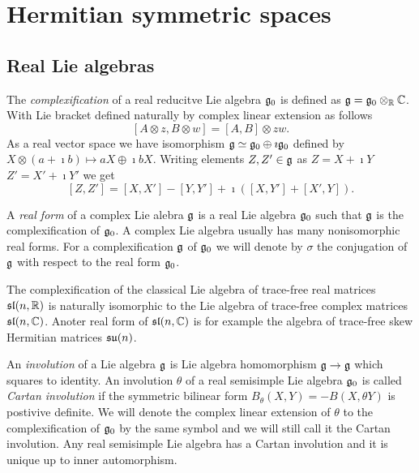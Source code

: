 \chapter{Hermitian symmetric spaces}\label{ch:hermitian}


\section{Real Lie algebras}

The \emph{complexification} of a real reducitve Lie algebra $\mathfrak{g}_0$ is defined as $\mathfrak{g} = \mathfrak{g}_0\otimes_{\mathbb{R}} \mathbb{C}$. With Lie bracket defined naturally by complex linear extension as follows
\[
 [A\otimes z, B\otimes w] = [A,B]\otimes zw.
\]
As a real vector space we have isomorphism $\mathfrak{g} \simeq \mathfrak{g}_0 \oplus \imath \mathfrak{g}_0$ defined by $X\otimes (a+\imath b) \mapsto aX \oplus \imath bX$. Writing elements $Z,Z'\in\mathfrak{g}$ as $Z = X + \imath Y$ $Z'=X'+\imath Y'$ we get \[[Z,Z'] = [X,X'] - [Y,Y'] + \imath \left( [X,Y'] + [X',Y]\right).\]

A \emph{real form} of a complex Lie alebra $\mathfrak{g}$ is a real Lie algebra $\mathfrak{g}_0$ such that $\mathfrak{g}$ is the complexification of $\mathfrak{g}_0$. A complex Lie algebra usually has many nonisomorphic real forms. For a complexification $\mathfrak{g}$ of $\mathfrak{g}_0$ we will denote by $\sigma$ the conjugation of $\mathfrak{g}$ with respect to the real form $\mathfrak{g}_0$.

\begin{example}
 The complexification of the classical Lie algebra of trace-free real matrices $\mathfrak{sl}(n,\mathbb{R})$ is naturally isomorphic to the Lie algebra of trace-free complex matrices $\mathfrak{sl}(n,\mathbb{C})$. Anoter real form of $\mathfrak{sl}(n,\mathbb{C})$ is for example the algebra of trace-free skew Hermitian  matrices  $\mathfrak{su}(n)$. %
\end{example}

An \emph{involution} of a Lie algebra $\mathfrak{g}$ is Lie algebra homomorphism $\mathfrak{g}\to\mathfrak{g}$ which squares to identity. An involution $\theta$ of a real semisimple Lie algebra $\mathfrak{g}_0$ is called \emph{Cartan involution} if the symmetric bilinear form $B_\theta(X,Y) = -B(X,\theta Y)$ is postivive definite. We will denote the complex linear extension of $\theta$ to the complexification of $\mathfrak{g}_0$ by the same symbol and we will still call it the Cartan involution. Any real semisimple Lie algebra has a Cartan involution and it is unique up to inner automorphism.



